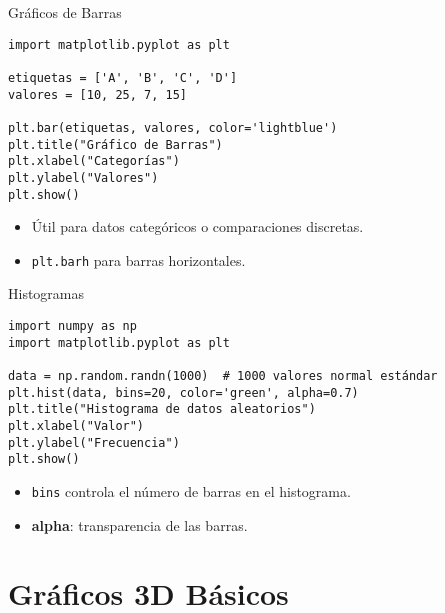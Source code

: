 \documentclass[10pt]{beamer}
\begin{document}
\begin{frame}[fragile]{Gráficos de Barras}
\begin{verbatim}
import matplotlib.pyplot as plt

etiquetas = ['A', 'B', 'C', 'D']
valores = [10, 25, 7, 15]

plt.bar(etiquetas, valores, color='lightblue')
plt.title("Gráfico de Barras")
plt.xlabel("Categorías")
plt.ylabel("Valores")
plt.show()
\end{verbatim}
\begin{itemize}
  \item Útil para datos categóricos o comparaciones discretas.
  \item \texttt{plt.barh} para barras horizontales.
\end{itemize}
\end{frame}

\begin{frame}[fragile]{Histogramas}
\begin{verbatim}
import numpy as np
import matplotlib.pyplot as plt

data = np.random.randn(1000)  # 1000 valores normal estándar
plt.hist(data, bins=20, color='green', alpha=0.7)
plt.title("Histograma de datos aleatorios")
plt.xlabel("Valor")
plt.ylabel("Frecuencia")
plt.show()
\end{verbatim}
\begin{itemize}
  \item \texttt{bins} controla el número de barras en el histograma.
  \item \textbf{alpha}: transparencia de las barras.
\end{itemize}
\end{frame}

\section{Gráficos 3D Básicos}
\end{document}
